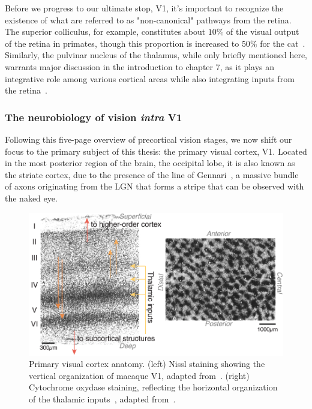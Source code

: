 Before we progress to our ultimate stop, \gls{V1}, it's important to recognize the existence of what are referred to as "non-canonical" pathways from the retina. The superior colliculus, for example, constitutes about $10\%$ of the visual output of the retina in primates, though this proportion is increased to $50\%$ for the cat~\cite{orban2012neuronal}. Similarly, the pulvinar nucleus of the thalamus, while only briefly mentioned here, warrants major discussion in the introduction to chapter 7, as it plays an integrative role among various cortical areas while also integrating inputs from the retina~\cite{casanova2004functions}.  



\subsubsection{The neurobiology of vision \textit{intra} V1}
Following this five-page overview of precortical vision stages, we now shift our focus to the primary subject of this thesis: the primary visual cortex, \gls{V1}. Located in the most posterior region of the brain, the occipital lobe, it is also known as the striate cortex, due to the presence of the line of Gennari~\cite{glickstein1984francesco}, a massive bundle of axons originating from the \gls{LGN} that forms a stripe that can be observed with the naked eye.

\begin{figure}[h!tbp]
\vspace{0.5cm}
\centering
\includegraphics[width=.9\textwidth]{fig/chap2_fig_V1.pdf}
\caption[Primary visual cortex's anatomy.]{Primary visual cortex anatomy. (left) Nissl staining showing the vertical organization of macaque \gls{V1}, adapted from~\cite{schmolesky2011primary}. (right) Cytochrome oxydase staining, reflecting the horizontal organization of the thalamic inputs~\cite{takahata2016does}, adapted from~\cite{murphy1998spacing}.}
\label{fig_chap2_vision_V1}
\end{figure}

